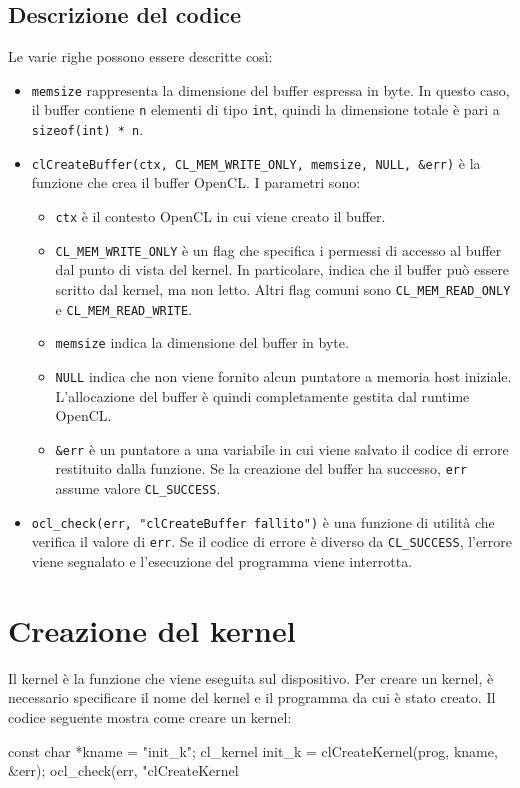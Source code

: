 \subsection*{Descrizione del codice}
Le varie righe possono essere descritte così:
\begin{itemize}
    \item \texttt{memsize} rappresenta la dimensione del buffer espressa in byte. In questo caso, il buffer contiene \texttt{n} elementi di tipo \texttt{int}, quindi la dimensione totale è pari a \texttt{sizeof(int) * n}.
    
    \item \texttt{clCreateBuffer(ctx, CL\_MEM\_WRITE\_ONLY, memsize, NULL, \&err)} è la funzione che crea il buffer OpenCL. I parametri sono:
    \begin{itemize}
        \item \texttt{ctx} è il contesto OpenCL in cui viene creato il buffer.
        
        \item \texttt{CL\_MEM\_WRITE\_ONLY} è un flag che specifica i permessi di accesso al buffer dal punto di vista del kernel. In particolare, indica che il buffer può essere scritto dal kernel, ma non letto. Altri flag comuni sono \texttt{CL\_MEM\_READ\_ONLY} e \texttt{CL\_MEM\_READ\_WRITE}.
        
        \item \texttt{memsize} indica la dimensione del buffer in byte.
        
        \item \texttt{NULL} indica che non viene fornito alcun puntatore a memoria host iniziale. L'allocazione del buffer è quindi completamente gestita dal runtime OpenCL.
        
        \item \texttt{\&err} è un puntatore a una variabile in cui viene salvato il codice di errore restituito dalla funzione. Se la creazione del buffer ha successo, \texttt{err} assume valore \texttt{CL\_SUCCESS}.
    \end{itemize}
    
    \item \texttt{ocl\_check(err, "clCreateBuffer fallito")} è una funzione di utilità che verifica il valore di \texttt{err}. Se il codice di errore è diverso da \texttt{CL\_SUCCESS}, l’errore viene segnalato e l’esecuzione del programma viene interrotta.
\end{itemize}

\section{Creazione del kernel}\label{sec:opencl_basi_kernel}
Il kernel è la funzione che viene eseguita sul dispositivo. Per creare un kernel, è necessario specificare il nome del kernel e il programma da cui è stato creato. Il codice seguente mostra come creare un kernel:
\begin{code}[caption={Creazione di un kernel OpenCL}, label={code:opencl_basi_kernel}]
	const char *kname = "init_k";
	cl_kernel init_k = clCreateKernel(prog, kname, &err);
	ocl_check(err, "clCreateKernel %
\end{code}

